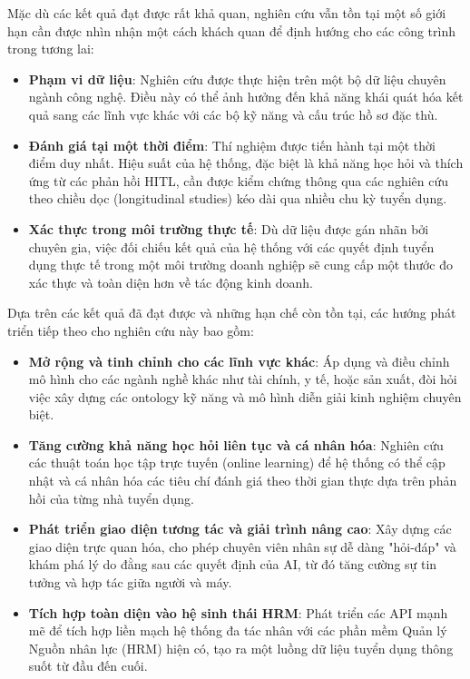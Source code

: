 \documentclass{article}
\begin{document}
\begin{itemize}[topsep=0pt, itemsep=4pt, leftmargin=40pt]
Mặc dù các kết quả đạt được rất khả quan, nghiên cứu vẫn tồn tại một số giới hạn cần được nhìn nhận một cách khách quan để định hướng cho các công trình trong tương lai:
\begin{itemize}[topsep=0pt, itemsep=4pt, leftmargin=40pt]
    \item \textbf{Phạm vi dữ liệu}: Nghiên cứu được thực hiện trên một bộ dữ liệu chuyên ngành công nghệ. Điều này có thể ảnh hưởng đến khả năng khái quát hóa kết quả sang các lĩnh vực khác với các bộ kỹ năng và cấu trúc hồ sơ đặc thù.
    \item \textbf{Đánh giá tại một thời điểm}: Thí nghiệm được tiến hành tại một thời điểm duy nhất. Hiệu suất của hệ thống, đặc biệt là khả năng học hỏi và thích ứng từ các phản hồi HITL, cần được kiểm chứng thông qua các nghiên cứu theo chiều dọc (longitudinal studies) kéo dài qua nhiều chu kỳ tuyển dụng.
    \item \textbf{Xác thực trong môi trường thực tế}: Dù dữ liệu được gán nhãn bởi chuyên gia, việc đối chiếu kết quả của hệ thống với các quyết định tuyển dụng thực tế trong một môi trường doanh nghiệp sẽ cung cấp một thước đo xác thực và toàn diện hơn về tác động kinh doanh.
\end{itemize}
    
Dựa trên các kết quả đã đạt được và những hạn chế còn tồn tại, các hướng phát triển tiếp theo cho nghiên cứu này bao gồm:
\begin{itemize}[topsep=0pt, itemsep=4pt, leftmargin=40pt]
    \item \textbf{Mở rộng và tinh chỉnh cho các lĩnh vực khác}: Áp dụng và điều chỉnh mô hình cho các ngành nghề khác như tài chính, y tế, hoặc sản xuất, đòi hỏi việc xây dựng các ontology kỹ năng và mô hình diễn giải kinh nghiệm chuyên biệt.
    \item \textbf{Tăng cường khả năng học hỏi liên tục và cá nhân hóa}: Nghiên cứu các thuật toán học tập trực tuyến (online learning) để hệ thống có thể cập nhật và cá nhân hóa các tiêu chí đánh giá theo thời gian thực dựa trên phản hồi của từng nhà tuyển dụng.
    \item \textbf{Phát triển giao diện tương tác và giải trình nâng cao}: Xây dựng các giao diện trực quan hóa, cho phép chuyên viên nhân sự dễ dàng "hỏi-đáp" và khám phá lý do đằng sau các quyết định của AI, từ đó tăng cường sự tin tưởng và hợp tác giữa người và máy.
    \item \textbf{Tích hợp toàn diện vào hệ sinh thái HRM}: Phát triển các API mạnh mẽ để tích hợp liền mạch hệ thống đa tác nhân với các phần mềm Quản lý Nguồn nhân lực (HRM) hiện có, tạo ra một luồng dữ liệu tuyển dụng thông suốt từ đầu đến cuối.
\end{itemize}
    

\end{itemize}
\end{document}
